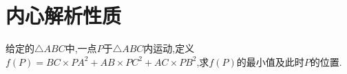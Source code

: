 \documentclass[]{article}
\title{}
\author{}
\date{}
\begin{document}
\maketitle
\section{内心解析性质}{
给定的$ \triangle ABC $中,一点$ P $于$ \triangle ABC $内运动,定义$ f(P)=BC\times PA^2+AB \times PC^2+AC \times PB^2 $,求$ f(P) $的最小值及此时$ P $的位置.
}
\end{document}
